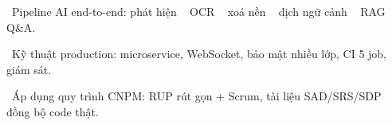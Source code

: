\documentclass[aspectratio=169,10pt]{beamer}
\newcommand{\arr}{\textcolor{mred}{\,\raisebox{0.1ex}{$\rightarrow$}\,}}
\begin{document}
{\begin{frame}[plain]
\begin{minipage}{0.92\paperwidth}
\begin{tcolorbox}[enhanced,sharp corners,colback=ink2,colframe=ink2,coltext=white,boxrule=0pt,fonttitle=\headfont\bfseries\color{gold},title={ĐIỀU ĐẠT ĐƯỢC}]
\textcolor{gold}{\textbullet}\ Pipeline AI end-to-end: phát hiện \arr\ OCR \arr\ xoá nền \arr\ dịch ngữ cảnh \arr\ RAG Q\&A.\par\vspace{1.6mm}
\textcolor{gold}{\textbullet}\ Kỹ thuật production: microservice, WebSocket, bảo mật nhiều lớp, CI 5 job, giám sát.\par\vspace{1.6mm}
\textcolor{gold}{\textbullet}\ Áp dụng quy trình CNPM: RUP rút gọn + Scrum, tài liệu SAD/SRS/SDP đồng bộ code thật.
\end{tcolorbox}
\end{minipage}
\end{frame}}

\end{document}
